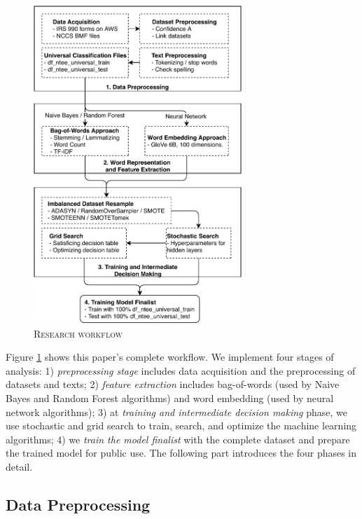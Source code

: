 \documentclass[11pt]{article}
\begin{document}
\begin{figure}
	\centering
	\caption{\textsc{Research workflow}} \label{fig:workflow}
	\includegraphics[width=0.7\textwidth]{tbl_fig/ntee_classification.pdf}
\end{figure}

Figure \ref{fig:workflow} shows this paper's complete workflow. We implement four stages of analysis: 1) \textit{preprocessing stage} includes data acquisition and the preprocessing of datasets and texts; 2) \textit{feature extraction} includes bag-of-words (used by Naive Bayes and Random Forest algorithms) and word embedding (used by neural network algorithms); 3) at \textit{training and intermediate decision making} phase, we use stochastic and grid search to train, search, and optimize the machine learning algorithms; 4) we \textit{train the model finalist} with the complete dataset and prepare the trained model for public use. The following part introduces the four phases in detail.

\subsection{Data Preprocessing}
\end{document}

